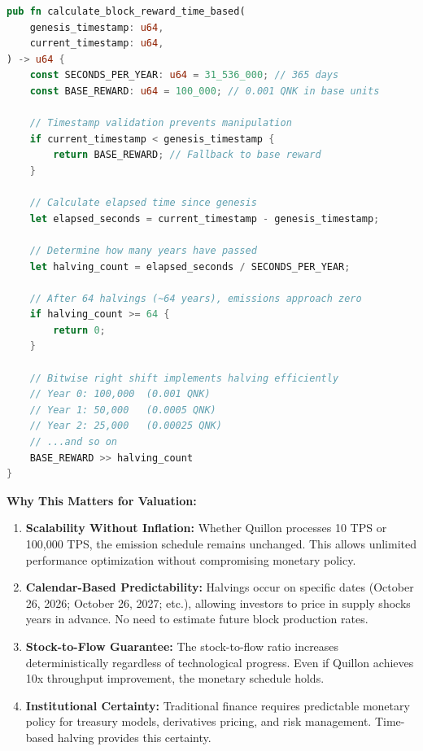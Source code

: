 \documentclass[11pt,a4paper]{article}
\begin{document}
\begin{lstlisting}[language=Rust,caption={Time-Based Halving Implementation - Performance Independent}]
pub fn calculate_block_reward_time_based(
    genesis_timestamp: u64,
    current_timestamp: u64,
) -> u64 {
    const SECONDS_PER_YEAR: u64 = 31_536_000; // 365 days
    const BASE_REWARD: u64 = 100_000; // 0.001 QNK in base units

    // Timestamp validation prevents manipulation
    if current_timestamp < genesis_timestamp {
        return BASE_REWARD; // Fallback to base reward
    }

    // Calculate elapsed time since genesis
    let elapsed_seconds = current_timestamp - genesis_timestamp;

    // Determine how many years have passed
    let halving_count = elapsed_seconds / SECONDS_PER_YEAR;

    // After 64 halvings (~64 years), emissions approach zero
    if halving_count >= 64 {
        return 0;
    }

    // Bitwise right shift implements halving efficiently
    // Year 0: 100,000  (0.001 QNK)
    // Year 1: 50,000   (0.0005 QNK)
    // Year 2: 25,000   (0.00025 QNK)
    // ...and so on
    BASE_REWARD >> halving_count
}
\end{lstlisting}

\textbf{Why This Matters for Valuation:}

\begin{enumerate}[leftmargin=*]
\item \textbf{Scalability Without Inflation:} Whether Quillon processes 10 TPS or 100,000 TPS, the emission schedule remains unchanged. This allows unlimited performance optimization without compromising monetary policy.

\item \textbf{Calendar-Based Predictability:} Halvings occur on specific dates (October 26, 2026; October 26, 2027; etc.), allowing investors to price in supply shocks years in advance. No need to estimate future block production rates.

\item \textbf{Stock-to-Flow Guarantee:} The stock-to-flow ratio increases deterministically regardless of technological progress. Even if Quillon achieves 10x throughput improvement, the monetary schedule holds.

\item \textbf{Institutional Certainty:} Traditional finance requires predictable monetary policy for treasury models, derivatives pricing, and risk management. Time-based halving provides this certainty.
\end{enumerate}
\end{document}
